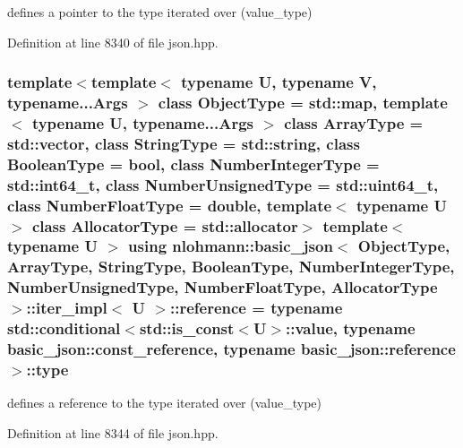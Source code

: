 defines a pointer to the type iterated over (value\+\_\+type) 



Definition at line 8340 of file json.\+hpp.

\hypertarget{classnlohmann_1_1basic__json_1_1iter__impl_a0e391c9035a242461d131b2dc0314256}{}
\subsubsection[{reference}]{\setlength{\rightskip}{0pt plus 5cm}template$<$template$<$ typename U, typename V, typename...\+Args $>$ class Object\+Type = std\+::map, template$<$ typename U, typename...\+Args $>$ class Array\+Type = std\+::vector, class String\+Type  = std\+::string, class Boolean\+Type  = bool, class Number\+Integer\+Type  = std\+::int64\+\_\+t, class Number\+Unsigned\+Type  = std\+::uint64\+\_\+t, class Number\+Float\+Type  = double, template$<$ typename U $>$ class Allocator\+Type = std\+::allocator$>$ template$<$typename U $>$ using {\bf nlohmann\+::basic\+\_\+json}$<$ Object\+Type, Array\+Type, String\+Type, Boolean\+Type, Number\+Integer\+Type, Number\+Unsigned\+Type, Number\+Float\+Type, Allocator\+Type $>$\+::{\bf iter\+\_\+impl}$<$ U $>$\+::{\bf reference} =  typename std\+::conditional$<$std\+::is\+\_\+const$<$U$>$\+::{\bf value}, typename {\bf basic\+\_\+json\+::const\+\_\+reference}, typename {\bf basic\+\_\+json\+::reference}$>$\+::{\bf type}}\label{classnlohmann_1_1basic__json_1_1iter__impl_a0e391c9035a242461d131b2dc0314256}


defines a reference to the type iterated over (value\+\_\+type) 



Definition at line 8344 of file json.\+hpp.

\hypertarget{classnlohmann_1_1basic__json_1_1iter__impl_a2b448f31a42182d78fe88abb425cfaf1}{}
